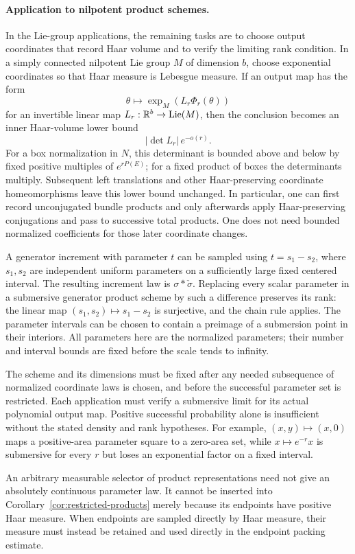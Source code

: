 \paragraph{Application to nilpotent product schemes.}
In the Lie-group applications, the remaining tasks are to choose output
coordinates that record Haar volume and to verify the limiting rank
condition.  In a simply connected
nilpotent Lie group $M$ of dimension $b$, choose exponential
coordinates so that Haar measure is Lebesgue measure.  If an output
map has the form
\[
 \theta\longmapsto\exp_M(L_r \Phi_r(\theta))
\]
for an invertible linear map $L_r:\mathbb R^b\to\operatorname{Lie}(M)$, then the
conclusion becomes an inner Haar-volume lower bound
\[
 |\det L_r|\,e^{-o(r)}.
\]
For a box normalization in $N$, this determinant is bounded above
and below by fixed positive multiples of $e^{rP(E)}$; for a fixed
product of boxes the determinants multiply.  Subsequent left
translations and other Haar-preserving coordinate homeomorphisms leave
this lower bound unchanged.  In particular, one can first record
unconjugated bundle products and only afterwards apply
Haar-preserving conjugations and pass to successive total products.
One does not need bounded normalized coefficients for those later
coordinate changes.

A generator increment with parameter $t$ can be sampled using
$t=s_1-s_2$, where $s_1,s_2$ are independent uniform parameters on
a sufficiently large fixed centered interval.  The resulting
increment law is $\sigma*\check\sigma$.  Replacing every scalar
parameter in a submersive generator product scheme by such a
difference preserves its rank: the linear map
$(s_1,s_2)\mapsto s_1-s_2$ is surjective, and the chain rule
applies.  The parameter intervals can be chosen to contain a
preimage of a submersion point in their interiors.  All parameters
here are the normalized parameters; their number and interval
bounds are fixed before the scale tends to infinity.

\begin{remark}
\label{rem:restricted-products-scope}
The scheme and its dimensions must be fixed after any needed
subsequence of normalized coordinate laws is chosen, and before
the successful parameter set is restricted.  Each application must
verify a submersive limit for its actual polynomial output map.
Positive successful probability alone is insufficient without
the stated density and rank hypotheses.  For example,
$(x,y)\mapsto(x,0)$ maps a positive-area parameter square to a
zero-area set, while $x\mapsto e^{-r}x$ is submersive for every
$r$ but loses an exponential factor on a fixed interval.

An arbitrary measurable selector of product representations need
not give an absolutely continuous parameter law.  It cannot be
inserted into Corollary~\ref{cor:restricted-products} merely because
its endpoints have positive Haar measure.  When endpoints are
sampled directly by Haar measure, their measure must instead be
retained and used directly in the endpoint packing estimate.
\end{remark}
